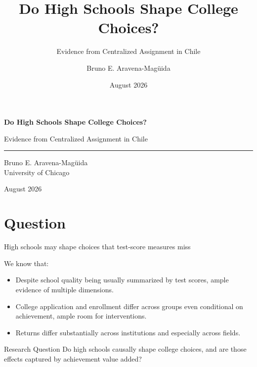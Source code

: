 \documentclass[11pt,aspectratio=169]{beamer}
\title{Do High Schools Shape College Choices?}
\subtitle{Evidence from Centralized Assignment in Chile}
\author{Bruno E. Aravena-Mag\"uida}
\institute{University of Chicago}
\date{August 2026}
\let\oldparencite\parencite
\renewcommand{\parencite}[2][]{%
  \footnotesize {\tiny \oldparencite[#1]{#2}} \normalsize%
}
\newenvironment{wideitemize}{%
  \begin{minipage}{0.92\textwidth}
  \begin{itemize}
  \addtolength{\itemsep}{0.75em}
}{%
  \end{itemize}
  \end{minipage}
}
\begin{document}
\begin{frame}[plain,t]
\vspace{1.25cm}
{\LARGE\bfseries Do High Schools Shape College Choices?\par}
\vspace{-0.05em}
{\large Evidence from Centralized Assignment in Chile\par}
\vspace{0.8em}
\rule{\textwidth}{0.4pt}
\vspace{0.9em}

Bruno E. Aravena-Mag\"uida\\
University of Chicago

\vspace{0.6em}
August 2026
\end{frame}

\section{Question}

\begin{frame}{High schools may shape choices that test-score measures miss}

  We know that:\par
  \vspace{0.05em}
  \begin{wideitemize}
  \addtolength{\itemsep}{-0.55em}
  \item Despite school quality being usually summarized by test scores, ample evidence of multiple dimensions. \parencite{jackson_what_2018,beuermann_what_2023,rose_effects_2022}

  \item College application and enrollment differ across groups even conditional on achievement, ample room for interventions. \parencite{hoxby_what_2015,dynarski_closing_2021,hastings_informed_2016,chetty_diversifying_2025}

  \item Returns differ substantially across institutions and especially across fields. \parencite{kirkeboen_field_2016}
\end{wideitemize}

\begin{alertblock}{Research Question}
\vspace{0.35em}
Do high schools causally shape college choices, and are those effects captured by achievement value added?
\end{alertblock}
\end{frame}
\end{document}
